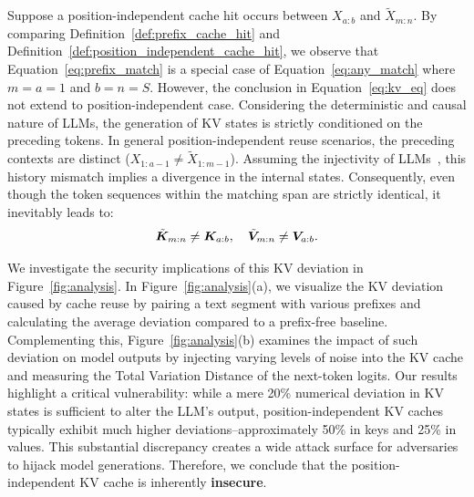 Suppose a position-independent cache hit occurs between $X_{a:b}$ and $\tilde{X}_{m:n}$. By comparing Definition~\ref{def:prefix_cache_hit} and Definition~\ref{def:position_independent_cache_hit}, we observe that Equation~\ref{eq:prefix_match} is a special case of Equation~\ref{eq:any_match} where $m = a = 1$ and $b = n = S$. However, the conclusion in Equation~\ref{eq:kv_eq} does not extend to position-independent case. Considering the deterministic and causal nature of LLMs, the generation of KV states is strictly conditioned on the preceding tokens. In general position-independent reuse scenarios, the preceding contexts are distinct ($X_{1:a-1} \neq \tilde{X}_{1:m-1}$). Assuming the injectivity of LLMs~\cite{nikolaou2025language}, this history mismatch implies a divergence in the internal states. Consequently, even though the token sequences within the matching span are strictly identical, it inevitably leads to:
\begin{align}
    \tilde{\bm{K}}_{m:n} \neq \bm{K}_{a:b}, \quad \tilde{\bm{V}}_{m:n} \neq \bm{V}_{a:b}.
\end{align}

We investigate the security implications of this KV deviation in Figure~\ref{fig:analysis}. In Figure~\ref{fig:analysis}(a), we visualize the KV deviation caused by cache reuse by pairing a text segment with various prefixes and calculating the average deviation compared to a prefix-free baseline. Complementing this, Figure~\ref{fig:analysis}(b) examines the impact of such deviation on model outputs by injecting varying levels of noise into the KV cache and measuring the Total Variation Distance of the next-token logits. 
% 
Our results highlight a critical vulnerability: while a mere 20\% numerical deviation in KV states is sufficient to alter the LLM's output, position-independent KV caches typically exhibit much higher deviations--approximately 50\% in keys and 25\% in values. This substantial discrepancy creates a wide attack surface for adversaries to hijack model generations. 
% 
Therefore, we conclude that the position-independent KV cache is inherently \textbf{insecure}.